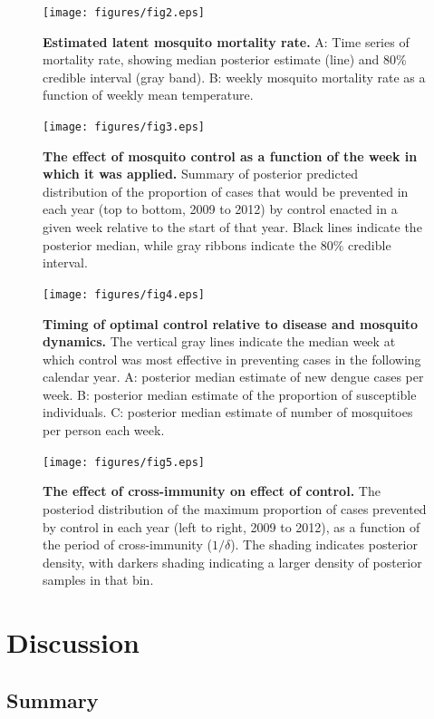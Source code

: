 \documentclass[10pt,letterpaper]{article}
\begin{document}
\begin{figure}[!h]
\texttt{[image: figures/fig2.eps]}
\caption{{\bf Estimated latent mosquito mortality rate.}
A: Time series of mortality rate, showing median posterior estimate (line) and 80\% credible interval (gray band). B: weekly mosquito mortality rate as a function of weekly mean temperature.
}
\label{mortality}
\end{figure}

\begin{figure}[!h]
\texttt{[image: figures/fig3.eps]}
\caption{{\bf The effect of mosquito control as a function of the week in which it was applied.}
Summary of posterior predicted distribution of the proportion of cases that would be prevented in each year (top to bottom, 2009 to 2012) by control enacted in a given week relative to the start of that year. Black lines indicate the posterior median, while gray ribbons indicate the $80\%$ credible interval.
}
\label{control}
\end{figure}

\begin{figure}[!h]
\texttt{[image: figures/fig4.eps]}
\caption{{\bf Timing of optimal control relative to disease and mosquito dynamics.}
The vertical gray lines indicate the median week at which control was most effective in preventing cases in the following calendar year. A: posterior median estimate of new dengue cases per week. B: posterior median estimate of the proportion of susceptible individuals. C: posterior median estimate of number of mosquitoes per person each week.
}
\label{timing}
\end{figure}

\begin{figure}[!h]
\texttt{[image: figures/fig5.eps]}
\caption{{\bf The effect of cross-immunity on effect of control.}
The posteriod distribution of the maximum proportion of cases prevented by control in each year (left to right, 2009 to 2012), as a function of the period of cross-immunity ($1/\delta$). The shading indicates posterior density, with darkers shading indicating a larger density of posterior samples in that bin.
}
\label{immunity}
\end{figure}



\section*{Discussion}

\subsection*{Summary}
\end{document}
